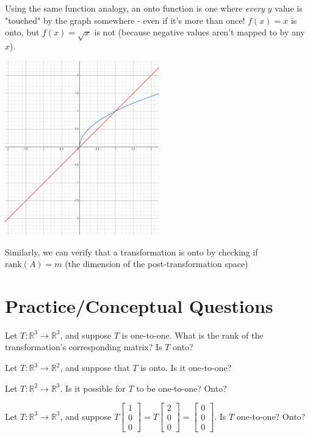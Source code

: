 \documentclass[11pt]{exam}
\begin{document}
    Using the same function analogy, an onto function is one where \textit{every} $y$ value is "touched" by the graph somewhere
    - even if it's more than once! $f(x) = x$ is onto, but $f(x) = \sqrt{x}$ is not (because negative values aren't mapped to by any $x$).
    \begin{center}
        \includegraphics[width=0.5\textwidth]{onto.JPG}
    \end{center}

    Similarly, we can verify that a transformation is onto by checking if $\text{rank}(A) = m$ (the dimension of the post-transformation space)

    \pagebreak
    \section{Practice/Conceptual Questions}
    \begin{questions}
        \item Let $T: \mathbb{R}^3 \rightarrow \mathbb{R}^3$, and suppose $T$ is one-to-one. What is the rank of the transformation's
        corresponding matrix? Is $T$ onto?
        \item Let $T: \mathbb{R}^3 \rightarrow \mathbb{R}^2$, and suppose that $T$ is onto. Is it one-to-one?
        \item Let $T: \mathbb{R}^2 \rightarrow \mathbb{R}^3$. Is it possible for $T$ to be one-to-one? Onto?
        \item Let $T: \mathbb{R}^3 \rightarrow \mathbb{R}^3$, and suppose
        $T \begin{bmatrix} 1 \\ 0 \\ 0 \end{bmatrix} = T \begin{bmatrix} 2 \\ 0 \\ 0 \end{bmatrix} = \begin{bmatrix} 0 \\ 0 \\ 0 \end{bmatrix}$.
        Is $T$ one-to-one? Onto?
    \end{questions}

    
\end{document}
